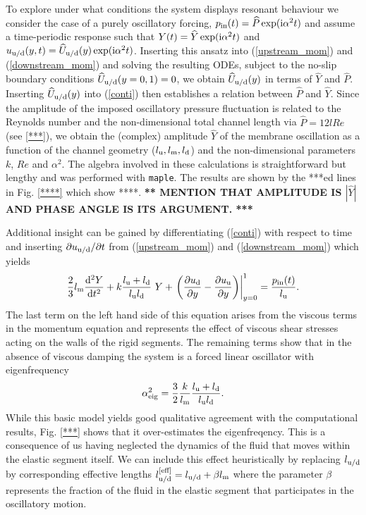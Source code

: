 \documentclass[aps,prl,reprint,superscriptaddress,floatfix]{revtex4-1}
\newcommand{\Rey}{\mathit{Re}}
\newcommand{\be}{\begin{equation}}
\newcommand{\ee}{\end{equation}}
\begin{document}
To explore under what conditions the system displays resonant
behaviour we consider the case of a purely oscillatory forcing, $p_{\rm in}(t) =
\widehat{P} \exp({\rm i}\alpha^2 t)$ and assume a time-periodic response such
that $Y(t) = \widehat{Y} \exp({\rm i}\alpha^2 t)$ and
$u_{\rm u/d}(y,t) = \widehat{U}_{\rm u/d}(y) \exp({\rm i}\alpha^2
t)$. Inserting this ansatz into (\ref{upstream_mom}) and
(\ref{downstream_mom}) and solving the resulting ODEs, subject to
the no-slip boundary conditions $\widehat{U}_{\rm u/d}(y=0,1)=0$,
we obtain $\widehat{U}_{\rm u/d}(y)$ in terms
of $\widehat{Y}$ and $\widehat{P}$.
Inserting $\widehat{U}_{\rm u/d}(y)$ into (\ref{conti}) then
establishes a relation between $\widehat{P}$ and $\widehat{Y}$. Since the
amplitude of the imposed oscillatory pressure fluctuation is related
to the Reynolds number and the non-dimensional total channel length
via $\widehat{P} = 12 l \Rey$ (see \ref{***}), we obtain
the (complex) amplitude $\widehat{Y}$ of the membrane oscillation
as a function of the channel geometry ($l_{\rm u}, l_{\rm m}, l_{\rm
  d}$) and the non-dimensional parameters $k$, $Re$ and $\alpha^2$.
The algebra involved in these calculations is straightforward but
lengthy and was performed with {\tt maple}. The results are
shown by the ***ed lines in Fig. \ref{****} which show ****.
{\bf *** MENTION THAT AMPLITUDE IS $|\widehat{Y}|$ AND PHASE
  ANGLE IS ITS ARGUMENT. ***}

 Additional insight can be gained by differentiating (\ref{conti})
with respect to time and inserting $\partial u_{\rm u/d}/\partial t$
from (\ref{upstream_mom}) and (\ref{downstream_mom}) which yields
\be
\frac{2}{3}l_{\rm m} \frac{{\rm d}^2 Y}{{\rm d}t^2} +
k \frac{l_{\rm u} + l_{\rm d}}{l_{\rm u} l_{\rm d}} \ Y
+ \left.
\left( \frac{\partial u_{\rm d}}{\partial y} -
       \frac{\partial u_{\rm u}}{\partial y} \right)
\right|_{y=0}^1 = \frac{p_{\rm in}(t)}{l_{\rm u}}.
\ee
The last term on the left hand side of this equation arises from the
viscous terms in the momentum equation and represents the effect of
viscous shear stresses acting on the walls of the rigid segments.
The remaining terms show that in the absence of viscous damping
the system is a forced linear oscillator with eigenfrequency
\be
\alpha_{\rm eig}^2 = \frac{3}{2} \frac{k}{l_{\rm m}}
\frac{l_{\rm u} + l_{\rm d}}{l_{\rm u} l_{\rm d}}.
\ee
While this basic model yields good qualitative agreement
with the computational results, Fig. \ref{***} shows that
it over-estimates the eigenfreqency. This is a consequence of us
having neglected the dynamics of the fluid that moves within the
elastic segment itself. We can include this effect heuristically by replacing
$l_{\rm u/d}$ by corresponding effective lengths $l_{\rm u/d}^{\rm [eff]} =
l_{\rm u/d} + \beta l_{\rm m}$ where the parameter $\beta$
represents the fraction of the fluid in the elastic
segment that participates in the oscillatory motion.
\end{document}
